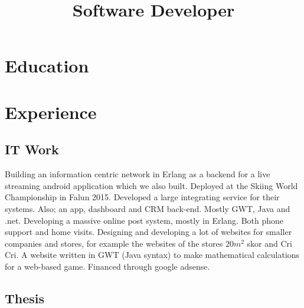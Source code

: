 \documentclass[11pt,a4paper]{moderncv}
\title{Software Developer}
\begin{document}
\maketitle
\section{\textbf{Education}}

\section{\textbf{Experience}}
\subsection{\textbf{IT Work}}
{Building an information centric network in Erlang as a backend for a live streaming android application which we also built. 
Deployed at the Skiing World Championship in Falun 2015.}
{Developed a large integrating service for their systems. Also; an app, dashboard and CRM back-end. Mostly GWT, Java and .net.}
{Developing a massive online post system, mostly in Erlang.}
{Both phone support and home visits.}
{Designing and developing a lot of websites for smaller companies and stores, for example the websites of the stores \begin{math}20m^2\end{math} skor and Cri Cri.}
{A website written in GWT (Java syntax) to make mathematical calculations for a web-based game. Financed through google adsense.}
\newpage

\vspace*{-2\baselineskip}
\subsection{\textbf{Thesis}}
\end{document}
